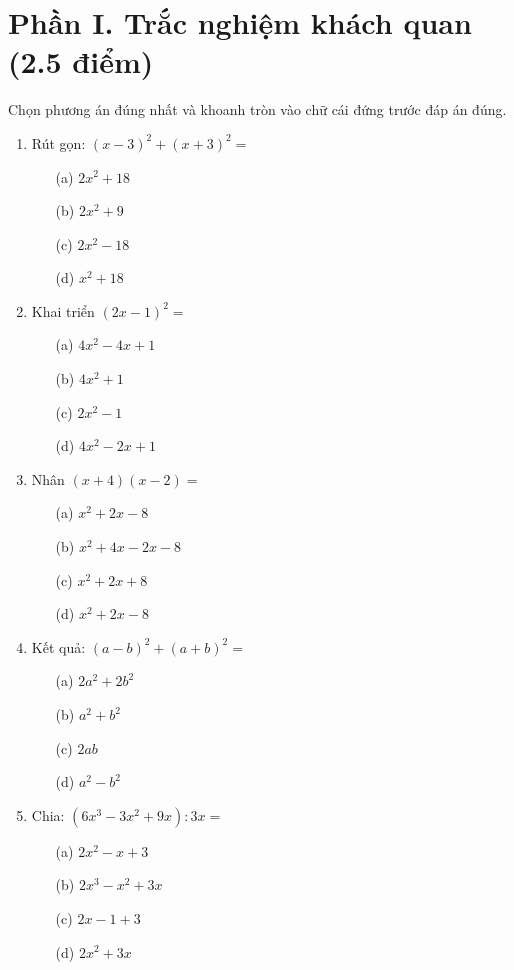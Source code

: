 \documentclass[12pt]{article}
\begin{document}
\section*{Phần I. Trắc nghiệm khách quan (2.5 điểm)}
\noindent Chọn phương án đúng nhất và khoanh tròn vào chữ cái đứng trước đáp án đúng.
\begin{multicols}{2}
\begin{enumerate}
    \item Rút gọn: $(x - 3)^2 + (x + 3)^2 =$
    \begin{itemize}
        \item[(a)] $2x^2 + 18$
        \item[(b)] $2x^2 + 9$
        \item[(c)] $2x^2 - 18$
        \item[(d)] $x^2 + 18$
    \end{itemize}

    \item Khai triển $(2x - 1)^2 =$
    \begin{itemize}
        \item[(a)] $4x^2 - 4x + 1$
        \item[(b)] $4x^2 + 1$
        \item[(c)] $2x^2 - 1$
        \item[(d)] $4x^2 - 2x + 1$
    \end{itemize}

    \item Nhân $(x + 4)(x - 2) =$
    \begin{itemize}
        \item[(a)] $x^2 + 2x - 8$
        \item[(b)] $x^2 + 4x -2x - 8$
        \item[(c)] $x^2 + 2x + 8$
        \item[(d)] $x^2 + 2x - 8$
    \end{itemize}

    \item Kết quả: $(a - b)^2 + (a + b)^2 =$
    \begin{itemize}
        \item[(a)] $2a^2 + 2b^2$
        \item[(b)] $a^2 + b^2$
        \item[(c)] $2ab$
        \item[(d)] $a^2 - b^2$
    \end{itemize}

    \item Chia: $(6x^3 - 3x^2 + 9x) : 3x =$
    \begin{itemize}
        \item[(a)] $2x^2 - x + 3$
        \item[(b)] $2x^3 - x^2 + 3x$
        \item[(c)] $2x - 1 + 3$
        \item[(d)] $2x^2 + 3x$
    \end{itemize}


\end{enumerate}
\end{multicols}
\end{document}
